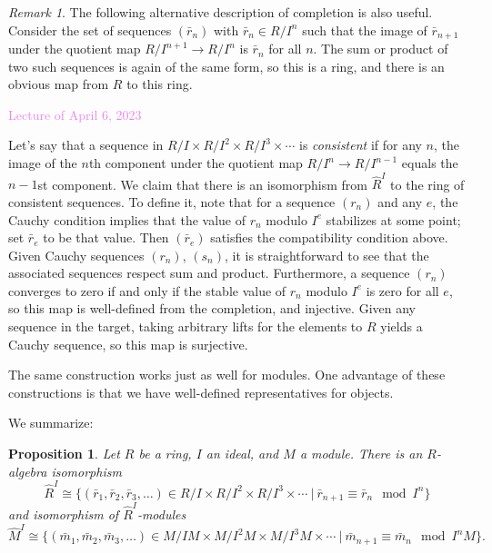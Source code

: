 \documentclass{amsart}[12pt]
\newcommand{\Apr}[1]{\textcolor{violet}{Lecture of April #1, 2023}}
\numberwithin{equation}{section}
\theoremstyle{plain} %
\newtheorem{prop}[equation]{Proposition}
\theoremstyle{definition}
\theoremstyle{remark}
\newtheorem{rem}[equation]{Remark}
\begin{document}
\begin{rem}
The following alternative description of completion is also useful. Consider the set of sequences $(\bar{r}_n)$ with $\bar{r}_n\in R/I^n$ such that the image of $\bar{r}_{n+1}$ under the quotient map $R/I^{n+1} \to R/I^n$ is $\bar{r}_{n}$ for all $n$. The sum or product of two such sequences is again of the same form, so this is a ring, and there is an obvious map from $R$ to this ring.

\Apr{6}

Let's say that a sequence in $R/I \times R/I^2 \times R/I^3 \times \cdots$ is \emph{consistent} if for any $n$, the image of the $n$th component under the quotient map $R/I^n \to R/I^{n-1}$ equals the $n-1$st component.
We claim that there is an isomorphism from $\hat{R}^I$ to the ring of consistent sequences. To define it, note that for a sequence $(r_n)$ and any $e$, the Cauchy condition implies that the value of $r_n$ modulo $I^e$ stabilizes at some point; set $\bar{r}_e$ to be that value. Then $(\bar{r}_e)$ satisfies the compatibility condition above. Given Cauchy sequences  $(r_n)$, $(s_n)$, it is straightforward to see that the associated sequences respect sum and product. Furthermore, a sequence $(r_n)$ converges to zero if and only if the stable value of $r_n$ modulo $I^e$ is zero for all $e$, so this map is well-defined from the completion, and injective. Given any sequence in the target, taking arbitrary lifts for the elements to $R$ yields a Cauchy sequence, so this map is surjective.

The same construction works just as well for modules. One advantage of these constructions  is that we have well-defined representatives for objects.
\end{rem}


We summarize:
\begin{prop} Let $R$ be a ring, $I$ an ideal, and $M$ a module. There is an $R$-algebra isomorphism
\[ \hat{R}^I \cong \{ (\bar{r}_1, \bar{r}_2, \bar{r}_3, \dots) \in R/I \times R/I^2 \times R/I^3 \times \cdots \ | \ \bar{r}_{n+1} \equiv \bar{r}_n \mod I^n \}\] and isomorphism of $\hat{R}^I$-modules
\[ \hat{M}^I \cong \{ (\bar{m}_1, \bar{m}_2, \bar{m}_3, \dots) \in M/IM \times M/I^2M \times M/I^3M \times \cdots \ | \ \bar{m}_{n+1} \equiv \bar{m}_n \mod I^nM \}.\]
\end{prop}
\end{document}
